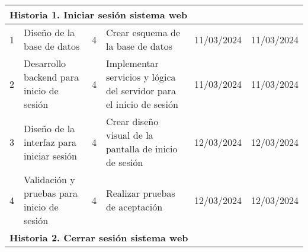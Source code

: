 \begin{longtable}{|p{0.5cm}|p{2cm}|p{1cm}|p{3cm}|p{1cm}|p{1cm}|}
    \multicolumn{6}{|l|}{\textbf{Historia 1. Iniciar sesión sistema web}}                                                                                                                                                                                                                                                                                                                       \\ \hline
    1                                        & Diseño de la base de datos                               & 4                                                              & Crear esquema de la base de datos                                              & 11/03/2024                                                    & 11/03/2024                                                          \\ \hline
    2                                        & Desarrollo backend para inicio de sesión                 & 4                                                              & Implementar servicios y lógica del servidor para el inicio de sesión           & 11/03/2024                                                    & 11/03/2024                                                          \\ \hline
    3                                        & Diseño de la interfaz para iniciar sesión                & 4                                                              & Crear diseño visual de la pantalla de inicio de sesión                         & 12/03/2024                                                    & 12/03/2024                                                          \\ \hline
    4                                        & Validación y pruebas para inicio de sesión               & 4                                                              & Realizar pruebas de aceptación                                                 & 12/03/2024                                                    & 12/03/2024                                                          \\ \hline
    \multicolumn{6}{|l|}{\textbf{Historia 2. Cerrar sesión sistema web}}                                                                                                                                                                                                                                                                                                                        \\ \hline

\end{longtable}
